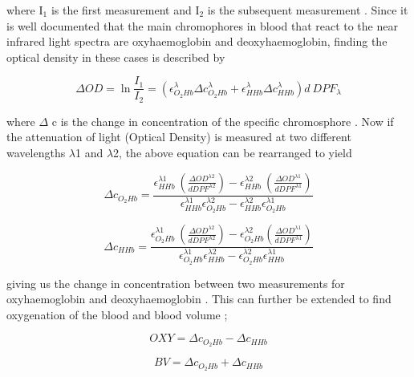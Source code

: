 where I$_1$ is the first measurement and I$_2$ is the subsequent measurement \cite{yam02}. Since it is well documented that the main chromophores in blood that react to the near infrared light spectra are oxyhaemoglobin and deoxyhaemoglobin, finding the optical density in these cases is described by

\begin{equation}
\Delta OD = \ln \frac{I_1}{I_2} = (\epsilon^\lambda_{O_{2}Hb}\Delta c^\lambda_{O_{2}Hb} + \epsilon^\lambda_{HHb}\Delta c^\lambda_{HHb})  d\ DPF_\lambda
\end{equation}

where $\Delta$ c is the change in concentration of the specific chromosphore \cite{eke06}. Now if the attenuation of light (Optical Density) is measured at two different wavelengths $\lambda$1 and $\lambda$2, the above equation can be rearranged to yield

\begin{equation}
\Delta c_{O_{2}Hb}  =  \frac{\epsilon^{\lambda 1}_{HHb} \ \left (\frac{\displaystyle \Delta OD^{\lambda 2}}{\displaystyle d DPF^{\lambda 2}} \right) - \epsilon^{\lambda 2}_{HHb} \ \left (\displaystyle \frac{\Delta OD^{\lambda 1}}{\displaystyle d DPF^{\lambda 1}}\right)}{ \epsilon^{\lambda 1}_{HHb}\epsilon^{\lambda 2}_{O_{2}Hb} - \epsilon^{\lambda 2}_{HHb}\epsilon^{\lambda 1}_{O_{2}Hb}}
\end{equation}

\begin{equation}
\Delta c_{HHb}  =  \frac{\epsilon^{\lambda 1}_{O_{2}Hb} \ \left (\frac{\displaystyle \Delta OD^{\lambda 2}}{\displaystyle d DPF^{\lambda 2}}\right) - \epsilon^{\lambda 2}_{O_{2}Hb} 
\left (\frac{\displaystyle \Delta OD^{\lambda 1}}{\displaystyle d DPF^{\lambda 1}}\right)}{\epsilon^{\lambda 1}_{O_{2}Hb}\epsilon^{\lambda 2}_{HHb} - \epsilon^{\lambda 2}_{O_{2}Hb}\epsilon^{\lambda 1}_{HHb}}
\end{equation}

giving us the change in concentration between two measurements for oxyhaemoglobin and deoxyhaemoglobin \cite{eke06,yam02}. This can further be extended to find oxygenation of the blood and blood volume \cite{rosen05};

\begin{equation}
OXY = \Delta c_{O_{2}Hb} - \Delta c_{HHb}
\end{equation}

\begin{equation}
BV = \Delta c_{O_{2}Hb} + \Delta c_{HHb}
\end{equation}

